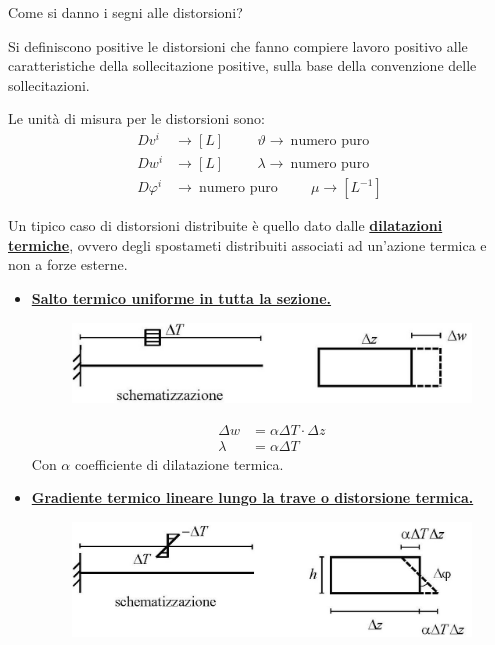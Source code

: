 \documentclass{article}
\begin{document}
\begin{adjustwidth}{2in}{}
		Come si danno i segni alle distorsioni? 
		
		Si definiscono positive le distorsioni che fanno compiere lavoro positivo alle caratteristiche della
		sollecitazione positive, sulla base della convenzione delle sollecitazioni.
		
		Le unità di misura per le distorsioni sono:
		\[ 
			\begin{split}
				Dv^i & \rightarrow [L] \hspace{1cm} \vartheta \rightarrow ~ \text{numero puro} \\
				Dw^i & \rightarrow [L] \hspace{1cm} \lambda \rightarrow ~ \text{numero puro} \\
				D\varphi^i & \rightarrow ~ \text{numero puro} \hspace{1cm} \mu \rightarrow [L^{-1}]
			\end{split}
		\]
		
		Un tipico caso di distorsioni distribuite è quello dato dalle \textbf{\underline{dilatazioni termiche}}, ovvero degli spostameti distribuiti associati ad un'azione termica e non a forze esterne.
		\begin{itemize}
			\item \textbf{\underline{Salto termico uniforme in tutta la sezione.}}
		
\begin{figure}[H]
	\centering
	\includegraphics[width=0.7\linewidth]{"immagini/1.PARTE8_Pagina_05"}
\end{figure}

		\[
			\begin{split}
				\Delta w & = \alpha\Delta T \cdot \Delta z \\
				\lambda & = \alpha\Delta T
			\end{split}
		\]
		Con $\alpha$ coefficiente di dilatazione termica.
\newpage
		
		\item \textbf{\underline{Gradiente termico lineare lungo la trave o distorsione termica.}}
		
\begin{figure}[H]
	\centering
	\includegraphics[width=0.7\linewidth]{"immagini/1.PARTE8_Pagina_06 (2)"}
\end{figure}


\end{itemize}
\end{adjustwidth}
\end{document}
